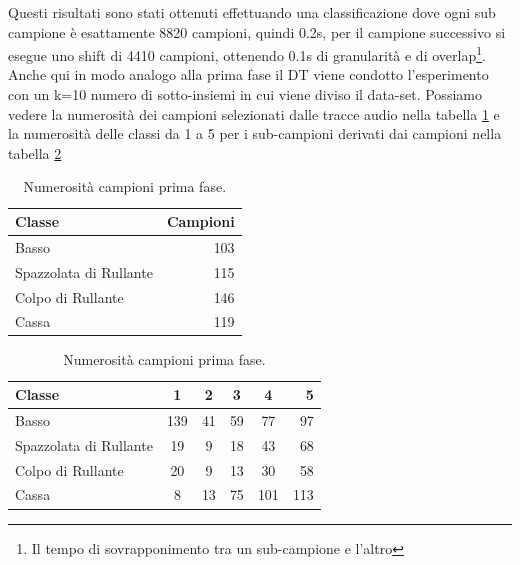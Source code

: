 Questi risultati sono stati ottenuti effettuando una classificazione dove ogni sub campione è esattamente 8820 campioni, quindi 0.2s, per il campione successivo si esegue uno shift di 4410 campioni, ottenendo 0.1s di granularità e di overlap\footnote{Il tempo di sovrapponimento tra un sub-campione e l'altro}. Anche qui in modo analogo alla prima fase il DT viene condotto l'esperimento con un k=10 numero di sotto-insiemi in cui viene diviso il data-set. Possiamo vedere la numerosità dei campioni selezionati dalle tracce audio nella tabella \ref{tab:numerosità_2.1} e la numerosità delle classi da 1 a 5 per i sub-campioni derivati dai campioni nella tabella \ref{tab:numerosità_2.2}\\

\begin{table}[h!]
	\begin{center}
		\begin{tabular}{l|r} %
			\textbf{Classe} & \textbf{Campioni}\\
			\hline
			Basso & 103\\
			Spazzolata di Rullante & 115\\
			Colpo di Rullante & 146\\
			Cassa & 119
		\end{tabular}
		\caption{Numerosità campioni prima fase.}
		\label{tab:numerosità_2.1}
	\end{center}
\end{table}

\begin{table}[h!]
	\begin{center}
		\begin{tabular}{l|c|c|c|c|r} %
			\textbf{Classe} & \textbf{1} & \textbf{2} & \textbf{3} & \textbf{4} & \textbf{5}\\
			\hline
			Basso & 139 & 41 & 59 & 77 & 97\\
			Spazzolata di Rullante & 19 & 9 & 18 & 43 & 68\\
			Colpo di Rullante & 20 & 9 & 13 & 30 & 58\\
			Cassa & 8 & 13 & 75 & 101 & 113
		\end{tabular}
		\caption{Numerosità campioni prima fase.}
		\label{tab:numerosità_2.2}
	\end{center}
\end{table}

